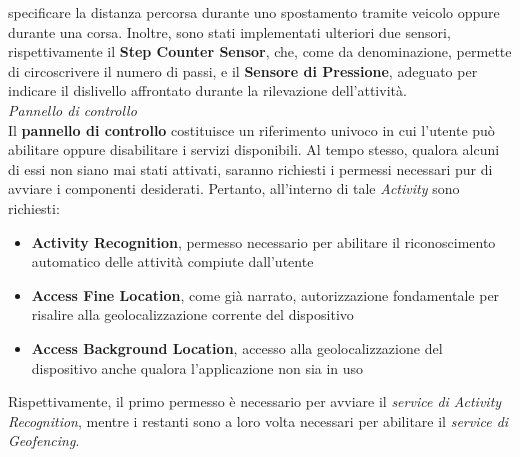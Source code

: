 \documentclass{article}
\begin{document}
    specificare la distanza percorsa durante uno spostamento tramite veicolo oppure durante una corsa.
    Inoltre, sono stati implementati ulteriori due sensori, rispettivamente il \textbf{Step Counter Sensor}, che, come da denominazione, permette di circoscrivere il numero di passi,
    e il \textbf{Sensore di Pressione}, adeguato per indicare il dislivello affrontato durante la rilevazione dell'attività.
    \vspace*{7pt}\\
    \textit{Pannello di controllo} \vspace*{7pt}\\
    Il \textbf{pannello di controllo} costituisce un riferimento univoco in cui l'utente può abilitare oppure disabilitare i servizi disponibili. Al tempo stesso, qualora alcuni di essi non siano mai stati attivati, saranno richiesti i permessi necessari pur di avviare i componenti desiderati. Pertanto, all'interno di tale \textit{Activity} sono richiesti:
    \begin{itemize}
        \renewcommand{\labelitemi}{-}
        \item \textbf{Activity Recognition}, permesso necessario per abilitare il riconoscimento automatico delle attività compiute dall'utente
        \item \textbf{Access Fine Location}, come già narrato, autorizzazione fondamentale per risalire alla geolocalizzazione corrente del dispositivo
        \item \textbf{Access Background Location}, accesso alla geolocalizzazione del dispositivo anche qualora l'applicazione non sia in uso
    \end{itemize}
    Rispettivamente, il primo permesso è necessario per avviare il \textit{service di Activity Recognition}, mentre i restanti sono a loro volta necessari per abilitare
    il \textit{service di Geofencing}.
    \begin{center}
        \begin{figure}[H]
            \centering
        \end{figure}
    \end{center}
\end{document}
